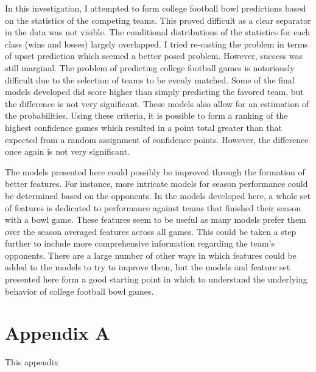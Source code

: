 \documentclass[12pt]{article}
\begin{document}
In this investigation, I attempted to form college football bowl predictions based on the statistics of the competing teams. This proved difficult as a clear separator in the data was not visible. The conditional distributions of the statistics for each class (wins and losses) largely overlapped. I tried re-casting the problem in terms of upset prediction which seemed a better posed problem. However, success was still marginal. The problem of predicting college football games is notoriously difficult due to the selection of teams to be evenly matched. Some of the final models developed did score higher than simply predicting the favored team, but the difference is not very significant. These models also allow for an estimation of the probabilities. Using these criteria, it is possible to form a ranking of the highest confidence games which resulted in a point total greater than that expected from a random assignment of confidence points. However, the difference once again is not very significant.

The models presented here could possibly be improved through the formation of better features. For instance, more intricate models for season performance could be determined based on the opponents. In the models developed here, a whole set of features is dedicated to performance against teams that finished their season with a bowl game. These features seem to be useful as many models prefer them over the season averaged features across all games. This could be taken a step further to include more comprehensive information regarding the team's opponents. There are a large number of other ways in which features could be added to the models to try to improve them, but the models and feature set presented here form a good starting point in which to understand the underlying behavior of college football bowl games.

\clearpage
\section*{Appendix A}
This appendix



\clearpage


\end{document}
